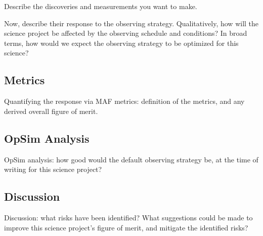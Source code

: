 Describe the discoveries and measurements you want to make.

Now, describe their response to the observing strategy. Qualitatively,
how will the science project be affected by the observing schedule and
conditions? In broad terms, how would we expect the observing strategy
to be optimized for this science?



\subsection{Metrics}
\label{sec:keyword:MW_Astrometry_metrics}

Quantifying the response via MAF metrics: definition of the metrics,
and any derived overall figure of merit.



\subsection{OpSim Analysis}
\label{sec:keyword:MW_Astrometry_analysis}

OpSim analysis: how good would the default observing strategy be, at
the time of writing for this science project?



\subsection{Discussion}
\label{sec:keyword:MW_Astrometry_discussion}

Discussion: what risks have been identified? What suggestions could be
made to improve this science project's figure of merit, and mitigate
the identified risks?



\navigationbar
